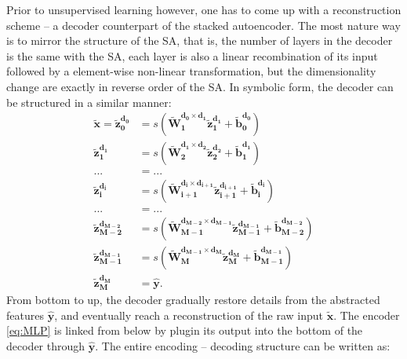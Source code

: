 Prior to unsupervised learning however, one has to come up with a reconstruction scheme -- a decoder counterpart of the stacked autoencoder. The most nature way is to mirror the structure of the SA, that is, the number of layers in the decoder is the same with the SA, each layer is also a linear recombination of its input followed by a element-wise non-linear transformation, but the dimensionality change are exactly in reverse order of the SA. In symbolic form, the decoder can be structured in a similar manner:
\begin{equation} \label{eq:DEC}
\begin{split}
  \boldsymbol{\tilde{x}}=
  \boldsymbol{\tilde{z}_{0  }^{d_{0  }}} &= s(\boldsymbol{\tilde{W}_{1  }^{d_{0  } \times d_{1  }} \tilde{z}_{1  }^{d_{1  }}}+\boldsymbol{\tilde{b}_{0  }^{d_{0  }}}) \\
  \boldsymbol{\tilde{z}_{1  }^{d_{1  }}} &= s(\boldsymbol{\tilde{W}_{2  }^{d_{1  } \times d_{2  }} \tilde{z}_{2  }^{d_{2  }}}+\boldsymbol{\tilde{b}_{1  }^{d_{1  }}}) \\
  ... &= ... \\
  \boldsymbol{\tilde{z}_{i  }^{d_{i  }}} &= s(\boldsymbol{\tilde{W}_{i+1}^{d_{i  } \times d_{i+1}} \tilde{z}_{i+1}^{d_{i+1}}}+\boldsymbol{\tilde{b}_{i  }^{d_{i  }}}) \\
  ... &= ... \\
  \boldsymbol{\tilde{z}_{M-2}^{d_{M-2}}} &= s(\boldsymbol{\tilde{W}_{M-1}^{d_{M-2} \times d_{M-1}} \tilde{z}_{M-1}^{d_{M-1}}}+\boldsymbol{\tilde{b}_{M-2}^{d_{M-2}}}) \\
  \boldsymbol{\tilde{z}_{M-1}^{d_{M-1}}} &= s(\boldsymbol{\tilde{W}_{M  }^{d_{M-1} \times d_{M  }} \tilde{z}_{M  }^{d_{M  }}}+\boldsymbol{\tilde{b}_{M-1}^{d_{M-1}}}) \\
  \boldsymbol{\tilde{z}_{M  }^{d_{M  }}} &= \boldsymbol{\hat{y}}.
\end{split}
\end{equation}
From bottom to up, the decoder gradually restore details from the abstracted features ${\boldsymbol{\hat{y}}}$, and eventually reach a reconstruction of the raw input $\boldsymbol{\tilde{x}}$. The encoder \ref{eq:MLP} is linked from below by plugin its output into the bottom of the decoder through ${\boldsymbol{\hat{y}}}$. The entire encoding -- decoding structure can be written as:
